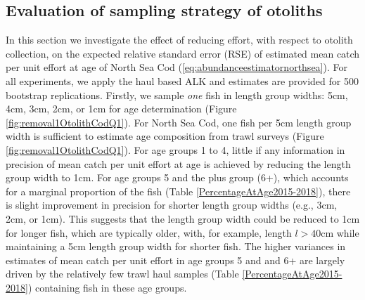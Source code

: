 \documentclass[a4paper 12pt]{article}
\numberwithin{equation}{section}
\begin{document}
\subsection{Evaluation of sampling strategy of otoliths}
\label{sec:optimumeffortresultsOtoliths}
In this section we investigate the effect of reducing effort, with respect to otolith collection, on the expected relative standard error (RSE) of estimated mean catch per unit effort at age of North Sea Cod (\ref{eq:abundanceestimatornorthsea}). For all experiments, we apply the haul based ALK and estimates are provided for 500 bootstrap replications. Firstly, we sample \textit{one} fish in length group widths: 5cm, 4cm, 3cm, 2cm, or 1cm for age determination (Figure \ref{fig:removal1OtolithCodQ1}).  For North Sea Cod, one fish per 5cm length group width is sufficient to estimate age composition from trawl surveys (Figure \ref{fig:removal1OtolithCodQ1}). For age groups 1 to 4, little if any information in precision of mean catch per unit effort at age is achieved by reducing the length group width to 1cm. For age groups 5 and the plus group (6+), which accounts for a marginal proportion of the fish (Table \ref{PercentageAtAge2015-2018}), there is slight improvement in precision for shorter length group widths (e.g., 3cm, 2cm, or 1cm). This suggests that the length group width could be reduced to 1cm for longer fish, which are typically older,  with,  for example, length $l > 40$cm while maintaining a 5cm length group width for shorter fish. The higher variances in estimates of mean catch per unit effort in age groups 5 and and 6+ are largely driven by the relatively few trawl haul samples (Table \ref{PercentageAtAge2015-2018}) containing fish in these age groups. \\
\end{document}
